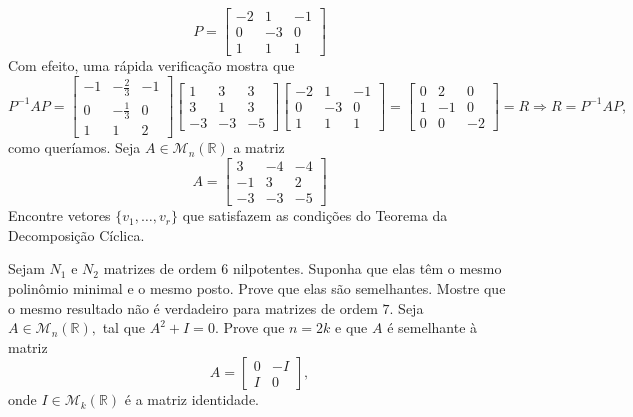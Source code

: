 \documentclass[11pt,a4paper]{article}
\begin{document}
{\[
P = \begin{bmatrix}
-2 & 1& -1\\
0 &-3 & 0\\
1 &1 &1
\end{bmatrix}
\]
Com efeito, uma rápida verificação mostra que
\[
P^{-1}AP = \left[\begin{matrix}
-1 & -\frac{2}{3} & -1 \\
0 & -\frac{1}{3} & 0 \\
1 & 1 & 2
\end{matrix}\right]  \begin{bmatrix}
1 & 3 & 3 \\
3 & 1 & 3 \\
-3 & -3 & -5
\end{bmatrix}\begin{bmatrix}
-2 & 1& -1\\
0 &-3 & 0\\
1 &1 &1
\end{bmatrix} = \left[\begin{matrix}
0 & 2 & 0 \\
1 & -1 & 0 \\
0 & 0 & -2
\end{matrix}\right] = R \Rightarrow R = P^{-1}AP,
\]
como queríamos.
 }
     Seja $A \in \mathcal{M}_n(\mathbb{R})$ a matriz
\[
A = \begin{bmatrix}
3 & -4 & -4 \\
-1 & 3 & 2 \\
-3 & -3 & -5
\end{bmatrix}
\]
Encontre vetores $\{v_1, \ldots , v_r \}$ que satisfazem as condições do Teorema da Decomposição Cíclica.

 \solucao{}
     Sejam $N_1$ e $N_2$ matrizes de ordem $6$ nilpotentes. Suponha que elas têm o mesmo polinômio
minimal e o mesmo posto. Prove que elas são semelhantes. Mostre que o mesmo resultado não é verdadeiro para matrizes de ordem $7.$
 \solucao{
 
 }
     Seja $A \in \mathcal{M}_n(\mathbb{R}),$ tal que $A^2 + I = 0.$ Prove que $n = 2k$ e que $A$ é semelhante à matriz
    \[
    A = \begin{bmatrix}
    0 & -I \\
    I & 0
    \end{bmatrix},
    \]
    onde $I \in \mathcal{M}_k(\mathbb{R})$ é a matriz identidade.
\solucao{}
\end{document}
